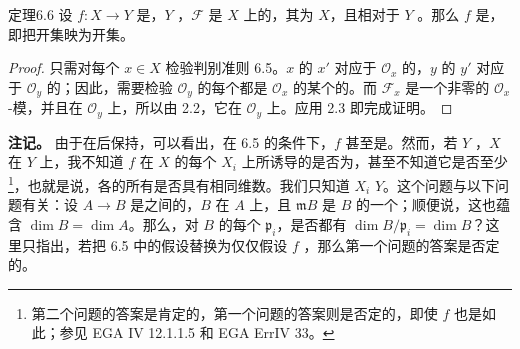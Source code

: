 \begin{SGAresult}{定理}{6.6}
设 $f:X\to Y$ 是，$Y$ ，$\mathcal F$ 是 $X$ 上的，其为 $X$，且相对于 $Y$ 。那么 $f$ 是，即把开集映为开集。
\end{SGAresult}
\begin{proof}
只需对每个 $x\in X$ 检验判别准则 6.5。$x$ 的 $x'$ 对应于 $\mathcal O_x$ 的，$y$ 的 $y'$ 对应于 $\mathcal O_y$ 的；因此，需要检验 $\mathcal O_y$ 的每个都是 $\mathcal O_x$ 的某个的。而 $\mathcal F_x$ 是一个非零的 $\mathcal O_x$-模，并且在 $\mathcal O_y$ 上，所以由 2.2，它在 $\mathcal O_y$ 上。应用 2.3 即完成证明。
\end{proof}

\textbf{注记。}
由于在后保持，可以看出，在 6.5 的条件下，$f$ 甚至是。然而，若 $Y$ ，$X$ 在 $Y$ 上，我不知道 $f$ 在 $X$ 的每个 $X_i$ 上所诱导的是否为，甚至不知道它是否至少\footnote{第二个问题的答案是肯定的，第一个问题的答案则是否定的，即使 $f$ 也是如此；参见 EGA IV 12.1.1.5 和 EGA ErrIV 33。}，也就是说，各的所有是否具有相同维数。我们只知道 $X_i$  $Y$。这个问题与以下问题有关：设 $A\to B$ 是之间的，$B$ 在 $A$ 上，且 $\mathfrak mB$ 是 $B$ 的一个；顺便说，这也蕴含 $\dim B=\dim A$。那么，对 $B$ 的每个 $\mathfrak p_i$，是否都有 $\dim B/\mathfrak p_i=\dim B$？这里只指出，若把 6.5 中的假设替换为仅仅假设 $f$ ，那么第一个问题的答案是否定的。

